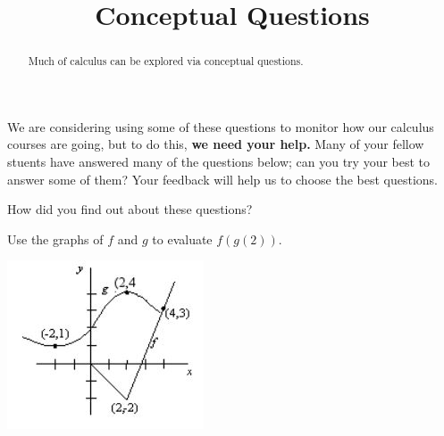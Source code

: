 \documentclass{ximera}
\title{Conceptual Questions}
\newcommand{\recommendation}[1]{}
\newcommand{\PCA}[1]{}
\begin{document}
\begin{abstract}
  Much of calculus can be explored via conceptual questions.
\end{abstract}
\maketitle

We are considering using some of these questions to monitor how our
calculus courses are going, but to do this, \textbf{we need your
  help.}  Many of your fellow stuents have answered many of the
questions below; can you try your best to answer some of them?  Your
feedback will help us to choose the best questions.

\begin{question}
How did you find out about these questions?
\begin{freeResponse}
\end{freeResponse}
\end{question}




\begin{problem}
  \recommendation{Elizabeth}
  \PCA{\#5}
  Use the graphs of $f$ and $g$ to evaluate $f(g(2))$.
  \begin{image}
    \includegraphics[scale = 1]{fg2}
  \end{image}
  \begin{multipleChoice}
  \end{multipleChoice}
\end{problem}
  
\end{document}
